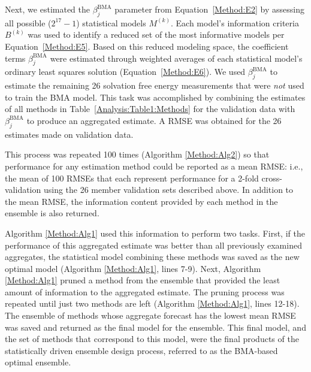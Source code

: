 \documentclass[journal=jpcbfk, manuscript=article]{achemso}
\newcommand{\+}[1]{\ensuremath{\mathbf{#1}}}
\newcommand{\rev}[1]{#1}
\begin{document}
Next, we estimated the $\beta_j^{\text{BMA}}$ parameter from Equation~\ref{Method:E2} by assessing all possible ($2^{17} -1$) statistical models $M^{(k)}$.
Each model's information criteria $B^{(k)}$ was used to identify a reduced set of \rev{the} most informative models per Equation~\ref{Method:E5}.
Based on this reduced modeling space, the coefficient terms $\beta_j^{\text{BMA}}$ were estimated through weighted averages of each statistical model's ordinary least squares solution (Equation~\ref{Method:E6}).
We used $\beta_j^{\text{BMA}}$ to estimate the remaining 26 solvation free energy measurements that were \emph{not} used to train the BMA model.
This task was accomplished by combining the estimates of all methods in Table~\ref{Analysis:Table1:Methods} for the validation data with $\beta_j^{\text{BMA}}$ to produce an aggregated estimate. 
A \rev{RMSE} was obtained for the 26 estimates made on validation data.

This process was repeated 100 times (Algorithm \ref{Method:Alg2}) so that performance for any estimation method could be reported as a mean RMSE: i.e., the mean of 100 RMSEs that each represent performance for a 2-fold cross-validation using the 26 member validation \rev{sets} described above.
In addition to the mean RMSE, the information content provided by each method in the ensemble is also returned. 

Algorithm \ref{Method:Alg1} used this information to perform two tasks.
First, if the performance of this aggregated estimate was better than all previously examined aggregates, the statistical model combining these methods was saved as the new optimal model (Algorithm \ref{Method:Alg1}, lines 7-9).
Next, Algorithm \ref{Method:Alg1} pruned \rev{a} method from the ensemble that provided the least amount of information to the aggregated estimate.
The pruning process was repeated until just two methods are left (Algorithm \ref{Method:Alg1}, lines 12-18).
The ensemble of methods whose aggregate forecast has the lowest mean RMSE was saved and returned as the final model for the ensemble.
This final model, and the set of methods that correspond to this model, were the final products of the statistically driven ensemble design process, referred to as the BMA-based optimal ensemble.
\end{document}
